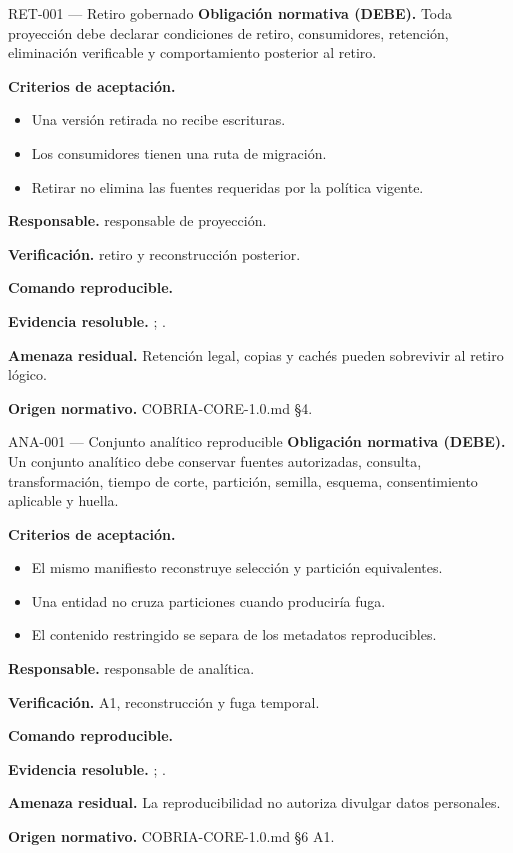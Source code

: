 \begin{requisito}{RET-001 --- Retiro gobernado}
\textbf{Obligación normativa (DEBE).} Toda proyección debe declarar condiciones de retiro, consumidores, retención, eliminación verificable y comportamiento posterior al retiro.\par
\textbf{Criterios de aceptación.}
\begin{itemize}
\item Una versión retirada no recibe escrituras.
\item Los consumidores tienen una ruta de migración.
\item Retirar no elimina las fuentes requeridas por la política vigente.
\end{itemize}
\textbf{Responsable.} responsable de proyección.\par
\textbf{Verificación.} retiro y reconstrucción posterior.\par
\textbf{Comando reproducible.} \texttt{}\par
\textbf{Evidencia resoluble.} ; .\par
\textbf{Amenaza residual.} Retención legal, copias y cachés pueden sobrevivir al retiro lógico.\par
\textbf{Origen normativo.} COBRIA-CORE-1.0.md §4.
\end{requisito}
\begin{requisito}{ANA-001 --- Conjunto analítico reproducible}
\textbf{Obligación normativa (DEBE).} Un conjunto analítico debe conservar fuentes autorizadas, consulta, transformación, tiempo de corte, partición, semilla, esquema, consentimiento aplicable y huella.\par
\textbf{Criterios de aceptación.}
\begin{itemize}
\item El mismo manifiesto reconstruye selección y partición equivalentes.
\item Una entidad no cruza particiones cuando produciría fuga.
\item El contenido restringido se separa de los metadatos reproducibles.
\end{itemize}
\textbf{Responsable.} responsable de analítica.\par
\textbf{Verificación.} A1, reconstrucción y fuga temporal.\par
\textbf{Comando reproducible.} \texttt{}\par
\textbf{Evidencia resoluble.} ; .\par
\textbf{Amenaza residual.} La reproducibilidad no autoriza divulgar datos personales.\par
\textbf{Origen normativo.} COBRIA-CORE-1.0.md §6 A1.
\end{requisito}
